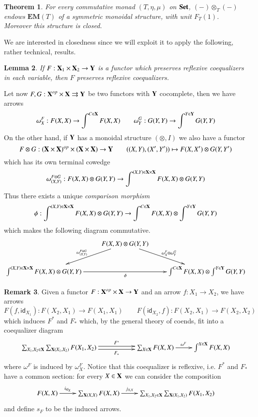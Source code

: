 \documentclass[12pt]{article}
\newtheorem{lemma}{Lemma}[section]
\newtheorem{theorem}[lemma]{Theorem}
\theoremstyle{definition}
\newtheorem{remark}[lemma]{Remark}
\newcommand{\Set}{\textbf{\textup{Set}}}
\newcommand{\eim}[1]{\mathbf{EM}{(#1)}}
\numberwithin{equation}{section}
\newcommand{\id}[1]{\mathsf{id}_{#1}}
\def\X{\textbf {\textup{X}}}
\def\Y{\textbf {\textup{Y}}}
\begin{document}
	\begin{theorem}\label{thm:mon}
	For every commutative monad $(T, \eta, \mu)$ on $\Set$, $(-)\otimes_T(-)$ endows $\eim{T}$ of a symmetric monoidal structure, with unit $F_T(1)$. Moreover this structure is closed.
	\end{theorem}
	
	We are interested in closedness since we will exploit it to apply the following, rather technical, results. 
	
	\begin{lemma}\label{lem:pres}
		If $F:\X_1\times \X_2\to \Y$ is a functor which preserves reflexive coequalizers in each variable, then $F$ preserves reflexive coequalizers.
	\end{lemma}

Let now $F, G:\X^{op}\times \X \rightrightarrows \Y$ be two functors with $\Y$ cocomplete, then we have arrows
\[\omega^F_X:F(X,X)\to \int^{C\in \X}F(X, X) \qquad \omega^G_Y: G(Y,Y)\to \int^{Y\in \Y} G(Y, Y) \]
On the other hand, if $\Y$ has a monoidal structure $(\otimes, I)$ we also have a functor
\[F\otimes G: (\X\times \X )^{op}\times (\X\times \X) \to \Y \qquad ((X, Y), (X', Y')) \mapsto F(X, X')\otimes G(Y, Y')\]
which has its own terminal cowedge
\[\omega^{F\otimes G}_{(X,Y)}: F(X, X)\otimes G(Y, Y) \to \int^{(X,Y)\in \X\times \X} F(X,X)\otimes G(Y,Y)\]
Thus there exists a unique \emph{comparison morphism}
\[\phi:\int^{(X,Y)\in \X\times \X} F(X,X)\otimes G(Y,Y) \to \int^{C\in \X}F(X, X) \otimes \int^{Y\in \Y} G(Y, Y)\]
which makes the following diagram commutative.
\[\xymatrix{& F(X, X)\otimes G(Y,Y) \ar[dl]_{\omega^{F\otimes G}_{(X,Y)}} \ar[dr]^{\omega^F_X\otimes  \omega^G_Y}\\\int^{(X,Y)\in \X\times \X} F(X,X)\otimes G(Y,Y) \ar[rr]_{\phi} & &\int^{C\in \X}F(X, X) \otimes \int^{Y\in \Y} G(Y, Y) }\]

\begin{remark}
Given a functor $F:\X^{op}\times \X \to \Y$  and an arrow $f:X_1\to X_2$, we have arrows
\[F(f, \id{X_1}):F(X_2, X_1) \to F(X_1, X_1)  \qquad F(\id{X_2}, f ):F(X_2, X_1)\to F(X_2, X_2)\]
which induces $F^*$ and $F_*$  which, by the general theory of coends, fit into a coequalizer diagram
	\[\xymatrix{ \sum_{X_1, X_2\in \X} \sum_{\X(X_1, X_2)}  F(X_1, X_2) \ar@<.5ex>[rr]^-{F^*} \ar@<-.5ex>[rr]_-{F_*}&& \sum_{X\in \X} F(X, X) \ar[r]^{\omega^F}& \int^{X\in \X} F(X,X)  }\]
		where $\omega^F$ is induced by $\omega^F_{X}$. Notice that this coequalizer is reflexive, i.e. $F^*$ and $F_*$ have a common section: for every $X\in \X$ we can consider the composition
		\[\xymatrix{F(X,X) \ar[r]^-{i_{\id{X}}}& \sum_{\X(X, X)} F(X, X) \ar[r]^-{j_{X,X}}& \sum_{X_1, X_2\in \X} \sum_{\X(X_1, X_2)}  F(X_1, X_2)} \]
	and define $s_F$ to be the induced arrows. 
\end{remark}
\end{document}
